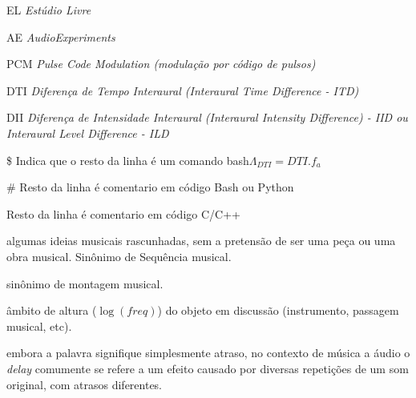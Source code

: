 \begin{listaespecial}[BIGNAMEWIDTH]
		\item[EL] \emph{Estúdio Livre}
		\item[AE] \emph{AudioExperiments}
		\item[PCM] \emph{Pulse Code Modulation (modulação por código de pulsos)}
		\item[DTI] \emph{Diferença de Tempo Interaural (\emph{Interaural Time Difference} - ITD)}
		\item[DII] \emph{Diferença de Intensidade Interaural (\emph{Interaural Intensity Difference)} - IID ou \emph{Interaural Level Difference} - ILD}
	\end{listaespecial} 

	\begin{listaespecial}[BIGNAMEWIDTH]
		\item[\$] Indica que o resto da linha é um comando bash$\Lambda_{DTI}=DTI . f_a$
		\item[\#] Resto da linha é comentario em código Bash ou Python
		\item[] Resto da linha é comentario em código C/C++
	\end{listaespecial} 

	\begin{listaespecial2}[BIGNAMEWIDTH]
		\item[Montagem musical :] algumas ideias musicais rascunhadas, sem a pretensão de ser uma peça ou uma obra musical. Sinônimo de Sequência musical.
		\item[Sequência musical :] sinônimo de montagem musical. 
		\item[Tessitura :] âmbito de altura ($\log(freq)$) do objeto em discussão (instrumento, passagem musical, etc).

		\item[Delay :] embora a palavra signifique simplesmente atraso, no contexto de música a áudio o \emph{delay} comumente se refere a um efeito causado por diversas repetições de um som original, com atrasos diferentes.
	\end{listaespecial2} 


\sumario

